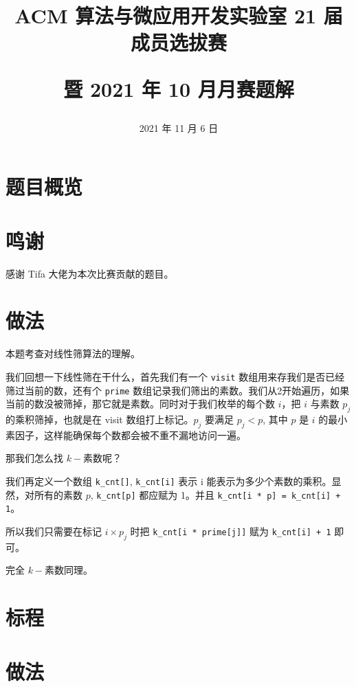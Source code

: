 \documentclass{../cpct/ctsol}
\title
{
    ACM 算法与微应用开发实验室 21 届成员选拔赛\par
    暨 2021 年 10 月月赛题解
}
\date{2021 年 11 月 6 日}
\begin{document}
\maketitle
{}

\section*{题目概览}

\solutiontab

\section*{鸣谢}

感谢 Tifa 大佬为本次比赛贡献的题目。

\makesolution
\section*{做法}

本题考查对线性筛算法的理解。

我们回想一下线性筛在干什么，首先我们有一个 \verb|visit| 数组用来存我们是否已经筛过当前的数，还有个 \verb|prime| 数组记录我们筛出的素数。我们从2开始遍历，如果当前的数没被筛掉，那它就是素数。同时对于我们枚举的每个数 $i$，把 $i$ 与素数 $p_j$ 的乘积筛掉，也就是在 visit 数组打上标记。$p_j$ 要满足 $p_j<p$, 其中 $p$ 是 $i$ 的最小素因子，这样能确保每个数都会被不重不漏地访问一遍。

那我们怎么找 $k-$素数呢？

我们再定义一个数组 \verb|k_cnt[]|, \verb|k_cnt[i]| 表示 i 能表示为多少个素数的乘积。显然，对所有的素数 $p$, \verb|k_cnt[p]| 都应赋为 1。并且 \verb|k_cnt[i * p] = k_cnt[i] + 1|。

所以我们只需要在标记 $i\times p_j$ 时把 \verb|k_cnt[i * prime[j]]| 赋为 \verb|k_cnt[i] + 1| 即可。

完全 $k-$素数同理。

\section*{标程}


\makesolution
\section*{做法}
\end{document}
